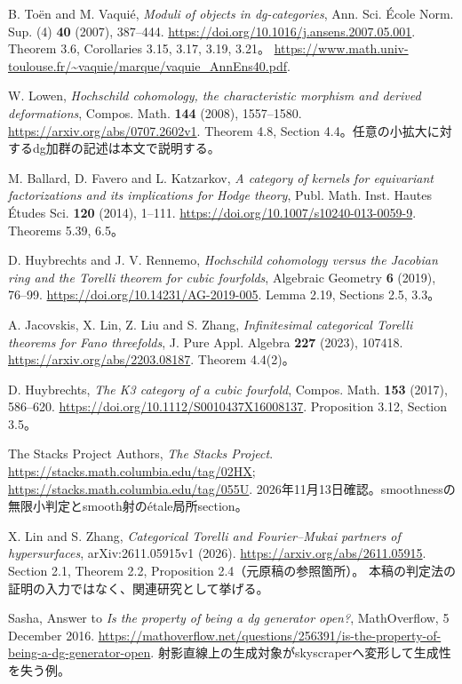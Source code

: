  B. Toën and M. Vaquié,
\emph{Moduli of objects in dg-categories},
Ann. Sci. École Norm. Sup. (4) \textbf{40} (2007), 387--444.
\url{https://doi.org/10.1016/j.ansens.2007.05.001}.
Theorem 3.6, Corollaries 3.15, 3.17, 3.19, 3.21。
\url{https://www.math.univ-toulouse.fr/~vaquie/marque/vaquie_AnnEns40.pdf}.

 W. Lowen,
\emph{Hochschild cohomology, the characteristic morphism and derived deformations},
Compos. Math. \textbf{144} (2008), 1557--1580.
\url{https://arxiv.org/abs/0707.2602v1}.
Theorem 4.8, Section 4.4。任意の小拡大に対するdg加群の記述は本文で説明する。

 M. Ballard, D. Favero and L. Katzarkov,
\emph{A category of kernels for equivariant factorizations and its implications for Hodge theory},
Publ. Math. Inst. Hautes Études Sci. \textbf{120} (2014), 1--111.
\url{https://doi.org/10.1007/s10240-013-0059-9}.
Theorems 5.39, 6.5。

 D. Huybrechts and J. V. Rennemo,
\emph{Hochschild cohomology versus the Jacobian ring and the Torelli theorem for cubic fourfolds},
Algebraic Geometry \textbf{6} (2019), 76--99.
\url{https://doi.org/10.14231/AG-2019-005}.
Lemma 2.19, Sections 2.5, 3.3。

 A. Jacovskis, X. Lin, Z. Liu and S. Zhang,
\emph{Infinitesimal categorical Torelli theorems for Fano threefolds},
J. Pure Appl. Algebra \textbf{227} (2023), 107418.
\url{https://arxiv.org/abs/2203.08187}.
Theorem 4.4(2)。

 D. Huybrechts,
\emph{The K3 category of a cubic fourfold},
Compos. Math. \textbf{153} (2017), 586--620.
\url{https://doi.org/10.1112/S0010437X16008137}.
Proposition 3.12, Section 3.5。

 The Stacks Project Authors, \emph{The Stacks Project}.
\url{https://stacks.math.columbia.edu/tag/02HX};
\url{https://stacks.math.columbia.edu/tag/055U}.
2026年11月13日確認。smoothnessの無限小判定とsmooth射のétale局所section。

 X. Lin and S. Zhang,
\emph{Categorical Torelli and Fourier--Mukai partners of hypersurfaces},
arXiv:2611.05915v1 (2026).
\url{https://arxiv.org/abs/2611.05915}.
Section 2.1, Theorem 2.2, Proposition 2.4（元原稿の参照箇所）。
本稿の判定法の証明の入力ではなく、関連研究として挙げる。

 Sasha,
Answer to \emph{Is the property of being a dg generator open?},
MathOverflow, 5 December 2016.
\url{https://mathoverflow.net/questions/256391/is-the-property-of-being-a-dg-generator-open}.
射影直線上の生成対象がskyscraperへ変形して生成性を失う例。
